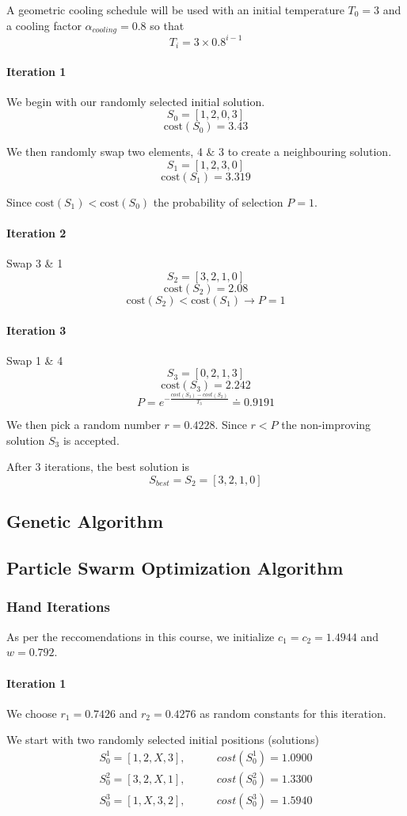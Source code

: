 \documentclass[a4paper]{article}
\newcommand{\subsubsubsection}[1]{\paragraph{#1} \mbox{}}
\begin{document}
A geometric cooling schedule will be used with an initial temperature $T_{0} = 3$ and a cooling factor $\alpha_{cooling} = 0.8$ so that
$$T_{i} = 3 \times 0.8^{i-1}$$

\subsubsubsection{Iteration 1}

We begin with our randomly selected initial solution.
$$S_0 = [ 1, 2, 0, 3 ]$$
$$\text{cost}(S_0) = 3.43$$

We then randomly swap two elements, 4 \& 3 to create a neighbouring solution.
$$S_1 = [ 1, 2, 3, 0 ]$$
$$\text{cost}(S_1) = 3.319$$

Since $\text{cost}(S_1) < \text{cost}(S_0)$ the probability of selection $P = 1$.

\subsubsubsection{Iteration 2}

Swap 3 \& 1
$$S_2 = [ 3, 2, 1, 0 ]$$
$$\text{cost}(S_2) = 2.08$$
$$\text{cost}(S_2) < \text{cost}(S_1) \rightarrow P = 1$$

\subsubsubsection{Iteration 3}

Swap 1 \& 4
$$S_3 = [ 0, 2, 1, 3 ]$$
$$\text{cost}(S_3) = 2.242$$
$$P = e^{-\frac{cost(S_3) - cost(S_2)}{T_3}} \doteq 0.9191$$

We then pick a random number $r = 0.4228$. Since $r < P$ the non-improving solution $S_3$ is accepted.

After 3 iterations, the best solution is
$$S_{best} = S_2 = [ 3, 2, 1, 0 ]$$

\subsection{Genetic Algorithm} %

\subsection{Particle Swarm Optimization Algorithm} %

\subsubsection{Hand Iterations}

As per the reccomendations in this course, we initialize $c_1 = c_2 = 1.4944$ and $w = 0.792$.

\subsubsubsection{Iteration 1}

We choose $r_1 = 0.7426$ and $r_2 = 0.4276$ as random constants for this iteration.

We start with two randomly selected initial positions (solutions)
\begin{align*}
S_0^1 = [1, 2, X, 3], & \qquad cost(S_0^1) = 1.0900 \\
S_0^2 = [3, 2, X, 1], & \qquad cost(S_0^2) = 1.3300 \\
S_0^3 = [1, X, 3, 2], & \qquad cost(S_0^3) = 1.5940
\end{align*}
\end{document}
